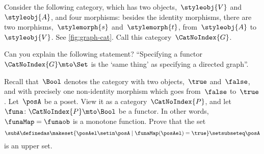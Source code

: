 \begin{gradedexercise}
    \label{ex:GraphsViaFunctors}
    Consider the following category, which has two objects,~$\styleobj{V}$ and~$\styleobj{A}$, and four morphisms: besides the identity morphisms, there are two morphisms,~$\stylemorph{s}$ and~$\stylemorph{t}$, from~$\styleobj{A}$ to~$\styleobj{V}$.
    See \cref{fig:graph-cat}.
    Call this category~$\CatNoIndex{G}$.

    Can you explain the following statement?
    ``Specifying a functor~$\CatNoIndex{G} \mto \Set$ is the `same thing' as specifying a directed graph''.
\end{gradedexercise}

\begin{marginfigure}
    \centering
    \caption{}
    \label{fig:graph-cat}
\end{marginfigure}

\begin{gradedexercise}
    \label{ex:UpperSetsViaFunctors}
    Recall that~$\Bool$ denotes the category with two objects,~$\true$ and~$\false$, and with precisely one non-identity morphism which goes from~$\false$ to~$\true$.
    Let~$\posA$ be a poset.
    View it as a category~$\CatNoIndex{P}$, and let~$\funa \colon \CatNoIndex{P} \mto \Bool$ be a functor.
    In other words,~$\funaMap = \funaob$ is a monotone function.
    Prove that the set
    \begin{equation}
        \subA \definedas \makeset{ \posAel \setin \posA \mid \funaMap(\posAel) = \true } \setsubseteq \posA
    \end{equation}
    is an upper set.
\end{gradedexercise}

